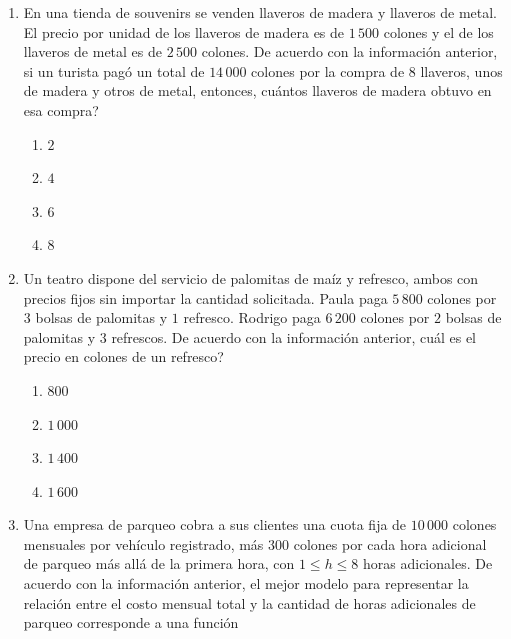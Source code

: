 \documentclass[11pt]{article}
\newcommand{\opcion}[2]{\item $#2$}
\begin{document}
\begin{enumerate}[label=\textbf{\arabic*.}, itemsep=2.5cm]
De acuerdo con la informaci\'on anterior, si un usuario asiste a $x$ clases en un mes, entonces el monto total que pagar\'a en el gimnasio Alfa ser\'a

\begin{enumerate}[label=\Alph*)]
  \item menor al que pagar\'ia si lo hiciera en Beta.
  \item mayor al que pagar\'ia si lo hiciera en Beta.
  \opcion{C}{\mbox{igual al que pagar\'ia si lo hiciera en Beta.}}
  \item el doble del que pagar\'ia si lo hiciera en Beta.
\end{enumerate}

\Needspace{0.35\textheight}
\item
En una tienda de souvenirs se venden llaveros de madera y llaveros de metal. El precio por unidad de los llaveros de madera es de $1\,500$ colones y el de los llaveros de metal es de $2\,500$ colones. De acuerdo con la informaci\'on anterior, si un turista pag\'o un total de $14\,000$ colones por la compra de $8$ llaveros, unos de madera y otros de metal, entonces, \textquestiondown cu\'antos llaveros de madera obtuvo en esa compra?

\begin{enumerate}[label=\Alph*)]
  \item $2$
  \item $4$
  \opcion{C}{6}
  \item $8$
\end{enumerate}

\Needspace{0.35\textheight}
\item
Un teatro dispone del servicio de palomitas de ma\'iz y refresco, ambos con precios fijos sin importar la cantidad solicitada. Paula paga $5\,800$ colones por $3$ bolsas de palomitas y $1$ refresco. Rodrigo paga $6\,200$ colones por $2$ bolsas de palomitas y $3$ refrescos. De acuerdo con la informaci\'on anterior, \textquestiondown cu\'al es el precio en colones de un refresco?

\begin{enumerate}[label=\Alph*)]
  \item $800$
  \opcion{B}{1\,000}
  \item $1\,400$
  \item $1\,600$
\end{enumerate}


\Needspace{0.32\textheight}
\item
Una empresa de parqueo cobra a sus clientes una cuota fija de $10\,000$ colones mensuales por veh\'iculo registrado, m\'as $300$ colones por cada hora adicional de parqueo m\'as all\'a de la primera hora, con $1 \leq h \leq 8$ horas adicionales. De acuerdo con la informaci\'on anterior, el mejor modelo para representar la relaci\'on entre el costo mensual total y la cantidad de horas adicionales de parqueo corresponde a una funci\'on


\end{enumerate}
\end{document}
